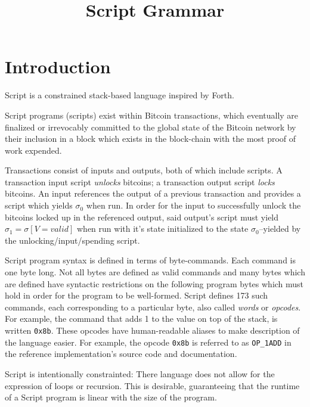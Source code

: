 \documentclass{article}
\begin{document}

\title{Script Grammar}
\date{}
\maketitle


\section{Introduction}

Script is a constrained stack-based language inspired by Forth.

Script programs (scripts) exist within Bitcoin transactions, which eventually are finalized or irrevocably committed to the global state of the Bitcoin network by their inclusion in a block which exists in the block-chain with the most proof of work expended.

Transactions consist of inputs and outputs, both of which include scripts. A transaction input script \textit{unlocks} bitcoins; a transaction output script \textit{locks} bitcoins. An input references the output of a previous transaction and provides a script which yields $\sigma_0$ when run. In order for the input to successfully unlock the bitcoins locked up in the referenced output, said output's script must yield $\sigma_1 = \sigma[V = valid]$ when run with it's state initialized to the state $\sigma_0$--yielded by the unlocking/input/spending script.


Script program syntax is defined in terms of byte-commands. Each command is one byte long. Not all bytes are defined as valid commands and many bytes which are defined have syntactic restrictions on the following program bytes which must hold in order for the program to be well-formed. Script defines 173 such commands, each corresponding to a particular byte, also called \textit{words} or \textit{opcodes}. For example, the command that adds 1 to the value on top of the stack, is written \texttt{0x8b}. These opcodes have human-readable aliases to make description of the language easier. For example, the opcode \texttt{0x8b} is referred to as \texttt{OP\_1ADD} in the reference implementation's source code and documentation.

Script is intentionally constrainted: There language does not allow for the expression of loops or recursion. This is desirable, guaranteeing that the runtime of a Script program is linear with the size of the program.
\end{document}
